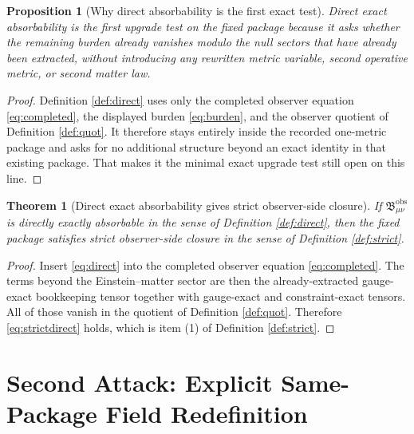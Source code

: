 \documentclass[11pt]{article}
\newcommand{\ObsBurden}{\mathfrak B_{\mu\nu}^{\mathrm{obs}}}
\newtheorem{proposition}{Proposition}
\newtheorem{theorem}{Theorem}
\begin{document}
\begin{proposition}[Why direct absorbability is the first exact test]
\label{prop:first}
Direct exact absorbability is the first upgrade test on the fixed package because it asks whether the remaining burden already vanishes modulo the null sectors that have \emph{already} been extracted, without introducing any rewritten metric variable, second operative metric, or second matter law.
\end{proposition}

\begin{proof}
Definition \ref{def:direct} uses only the completed observer equation \eqref{eq:completed}, the displayed burden \eqref{eq:burden}, and the observer quotient of Definition \ref{def:quot}. It therefore stays entirely inside the recorded one-metric package and asks for no additional structure beyond an exact identity in that existing package. That makes it the minimal exact upgrade test still open on this line.
\end{proof}

\begin{theorem}[Direct exact absorbability gives strict observer-side closure]
\label{thm:direct}
If \(\ObsBurden\) is directly exactly absorbable in the sense of Definition \ref{def:direct}, then the fixed package satisfies strict observer-side closure in the sense of Definition \ref{def:strict}.
\end{theorem}

\begin{proof}
Insert \eqref{eq:direct} into the completed observer equation \eqref{eq:completed}. The terms beyond the Einstein--matter sector are then the already-extracted gauge-exact bookkeeping tensor together with gauge-exact and constraint-exact tensors. All of those vanish in the quotient of Definition \ref{def:quot}. Therefore \eqref{eq:strictdirect} holds, which is item (1) of Definition \ref{def:strict}.
\end{proof}

\section{Second Attack: Explicit Same-Package Field Redefinition}
\end{document}
